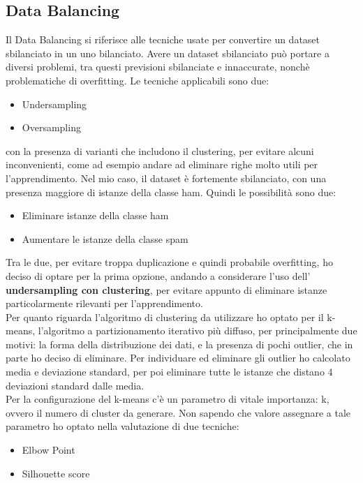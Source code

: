 \documentclass[]{article}
\begin{document}
        \subsection{Data Balancing}
            Il Data Balancing si riferisce alle tecniche usate per convertire un dataset sbilanciato in un uno bilanciato. Avere un dataset sbilanciato può portare a diversi problemi, tra questi previsioni sbilanciate e innaccurate, nonchè problematiche di overfitting.
            Le tecniche applicabili sono due:
            \begin{itemize}
                \item Undersampling
                \item Oversampling
            \end{itemize}
            con la presenza di varianti che includono il clustering, per evitare alcuni inconvenienti, come ad esempio andare ad eliminare righe molto utili per l'apprendimento. Nel mio caso, il dataset è fortemente sbilanciato, con una presenza maggiore di istanze della classe ham. Quindi le possibilità sono due:
            \begin{itemize}
                \item Eliminare istanze della classe ham
                \item Aumentare le istanze della classe spam
            \end{itemize}
            Tra le due, per evitare troppa duplicazione e quindi probabile overfitting, ho deciso di optare per la prima opzione, andando a considerare l'uso dell' \textbf{undersampling con clustering}, per evitare appunto di eliminare istanze particolarmente rilevanti per l'apprendimento.\\
            Per quanto riguarda l'algoritmo di clustering da utilizzare ho optato per il k-means, l'algoritmo a partizionamento iterativo più diffuso, per principalmente due motivi: la forma della distribuzione dei dati, e la presenza di pochi outlier, che in parte ho deciso di eliminare. Per individuare ed eliminare gli outlier ho calcolato media e deviazione standard, per poi eliminare tutte le istanze che distano 4 deviazioni standard dalle media.\\
            Per la configurazione del k-means c'è un parametro di vitale importanza: k, ovvero il numero di cluster da generare. Non sapendo che valore assegnare a tale parametro ho optato nella valutazione di due tecniche:
            \begin{itemize}
                \item Elbow Point
                \item Silhouette score
            \end{itemize}
\end{document}
